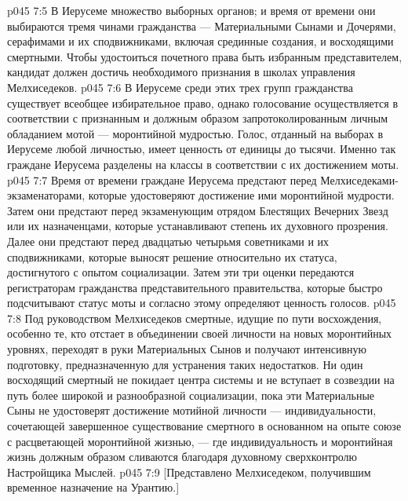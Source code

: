 \vs p045 7:5 \pc В Иерусеме множество выборных органов; и время от времени они выбираются тремя чинами гражданства --- Материальными Сынами и Дочерями, серафимами и их сподвижниками, включая срединные создания, и восходящими смертными. Чтобы удостоиться почетного права быть избранным представителем, кандидат должен достичь необходимого признания в школах управления Мелхиседеков.
\vs p045 7:6 В Иерусеме среди этих трех групп гражданства существует всеобщее избирательное право, однако голосование осуществляется в соответствии с признанным и должным образом запротоколированным личным обладанием мотой --- моронтийной мудростью. Голос, отданный на выборах в Иерусеме любой личностью, имеет ценность от единицы до тысячи. Именно так граждане Иерусема разделены на классы в соответствии с их достижением моты.
\vs p045 7:7 Время от времени граждане Иерусема предстают перед Мелхиседеками\hyp{}экзаменаторами, которые удостоверяют достижение ими моронтийной мудрости. Затем они предстают перед экзаменующим отрядом Блестящих Вечерних Звезд или их назначенцами, которые устанавливают степень их духовного прозрения. Далее они предстают перед двадцатью четырьмя советниками и их сподвижниками, которые выносят решение относительно их статуса, достигнутого с опытом социализации. Затем эти три оценки передаются регистраторам гражданства представительного правительства, которые быстро подсчитывают статус моты и согласно этому определяют ценность голосов.
\vs p045 7:8 \pc Под руководством Мелхиседеков смертные, идущие по пути восхождения, особенно те, кто отстает в объединении своей личности на новых моронтийных уровнях, переходят в руки Материальных Сынов и получают интенсивную подготовку, предназначенную для устранения таких недостатков. Ни один восходящий смертный не покидает центра системы и не вступает в созвездии на путь более широкой и разнообразной социализации, пока эти Материальные Сыны не удостоверят достижение мотийной личности --- индивидуальности, сочетающей завершенное существование смертного в основанном на опыте союзе с расцветающей моронтийной жизнью, --- где индивидуальность и моронтийная жизнь должным образом сливаются благодаря духовному сверхконтролю Настройщика Мыслей.
\vsetoff
\vs p045 7:9 [Представлено Мелхиседеком, получившим временное назначение на Урантию.]
